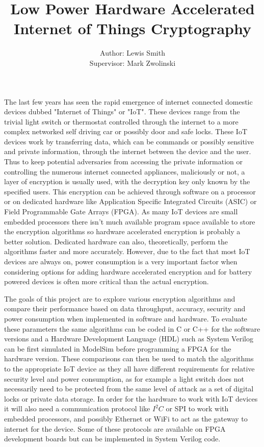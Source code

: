 \documentclass[11pt]{article}
\title{\vspace{-20mm}Low Power Hardware Accelerated Internet of Things Cryptography}
\author{Author: Lewis Smith\\ Supervisor: Mark Zwolinski}
\begin{document}
   
   \maketitle
   
   The last few years has seen the rapid emergence of internet connected domestic devices dubbed "Internet of Things" or "IoT". These devices range from the trivial light switch or thermostat controlled through the internet to a more complex networked self driving car or possibly door and safe locks. These IoT devices work by transferring data, which can be commands or possibly sensitive and private information, through the internet between the device and the user. Thus to keep potential adversaries from accessing the private information or controlling the numerous internet connected appliances, maliciously or not, a layer of encryption is usually used, with the decryption key only known by the specified users. This encryption can be achieved through software on a processor or on dedicated hardware like Application Specific Integrated Circuits (ASIC) or Field Programmable Gate Arrays (FPGA). As many IoT devices are small embedded processors there isn't much available program space available to store the encryption algorithms so hardware accelerated encryption is probably a better solution. Dedicated hardware can also, theoretically, perform the algorithms faster and more accurately. However, due to the fact that most IoT devices are always on, power consumption is a very important factor when considering options for adding hardware accelerated encryption and for battery powered devices is often more critical than the actual encryption. 
   
   The goals of this project are to explore various encryption algorithms and compare their performance based on data throughput, accuracy, security and power consumption when implemented in software and hardware. To evaluate these parameters the same algorithms can be coded in C or C++ for the software versions and a Hardware Development Language (HDL) such as System Verilog can be first simulated in ModelSim before programming a FPGA for the hardware version. These comparisons can then be used to match the algorithms to the appropriate IoT device as they all have different requirements for relative security level and power consumption, as for example a light switch does not necessarily need to be protected from the same level of attack as a set of digital locks or private data storage. In order for the hardware to work with IoT devices it will also need a communication protocol like $I^2 C$ or SPI to work with embedded processors, and possibly Ethernet or WiFi to act as the gateway to internet for the device. Some of these protocols are available on FPGA development boards but can be implemented in System Verilog code.
   
\end{document}
